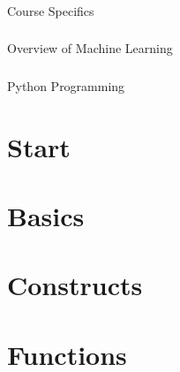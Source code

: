  \begin{frame}[fragile]\frametitle{}
 \begin{center}
 {\Large Course Specifics}
 \end{center}
 \end{frame}

 


 \begin{frame}[fragile]\frametitle{}
 \begin{center}
 {\Large Overview of Machine Learning}
 \end{center}
 \end{frame}

 

 \begin{frame}[fragile]\frametitle{}
 \begin{center}
 {\Large Python Programming}
 \end{center}
 \end{frame}

 \section[Py Start]{Start}
 
 


\section[Basics]{Basics}



 
\section[Constructs]{Constructs}




 

 \section[Functions]{Functions}
 
 
 
  
 
